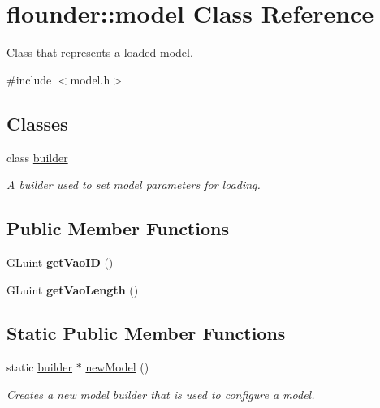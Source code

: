 \hypertarget{classflounder_1_1model}{}\section{flounder\+:\+:model Class Reference}
\label{classflounder_1_1model}


Class that represents a loaded model.  




{\ttfamily \#include $<$model.\+h$>$}

\subsection*{Classes}
\begin{DoxyCompactItemize}
\item 
class \hyperlink{classflounder_1_1model_1_1builder}{builder}
\begin{DoxyCompactList}\small\item\em A builder used to set model parameters for loading. \end{DoxyCompactList}\end{DoxyCompactItemize}
\subsection*{Public Member Functions}
\begin{DoxyCompactItemize}
\item 
\mbox{\label{classflounder_1_1model_ab057b09c76aef84cd52ba2b8dfa3f3de}} 
G\+Luint {\bfseries get\+Vao\+ID} ()
\item 
\mbox{\label{classflounder_1_1model_a25e92fa495585a691c80be98fb1d9a98}} 
G\+Luint {\bfseries get\+Vao\+Length} ()
\end{DoxyCompactItemize}
\subsection*{Static Public Member Functions}
\begin{DoxyCompactItemize}
\item 
static \hyperlink{classflounder_1_1model_1_1builder}{builder} $\ast$ \hyperlink{classflounder_1_1model_a55bec80a4092dbe35c319c49d1d50ed8}{new\+Model} ()
\begin{DoxyCompactList}\small\item\em Creates a new model builder that is used to configure a model. \end{DoxyCompactList}\end{DoxyCompactItemize}
